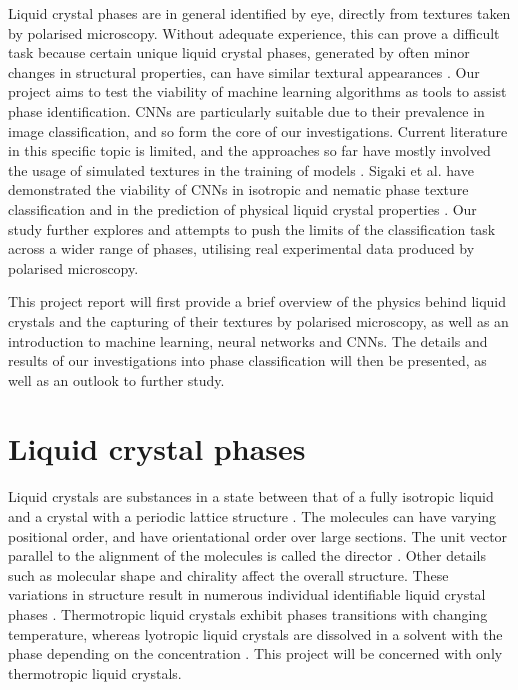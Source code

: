 \documentclass[12pt]{article}
\begin{document}
Liquid crystal phases are in general identified by eye, directly from textures taken by polarised microscopy. Without adequate experience, this can prove a difficult task because certain unique liquid crystal phases, generated by often minor changes in structural properties, can have similar textural appearances \cite{Dierking03}. Our project aims to test the viability of machine learning algorithms as tools to assist phase identification. CNNs are particularly suitable due to their prevalence in image classification, and so form the core of our investigations. Current literature in this specific topic is limited, and the approaches so far have mostly involved the usage of simulated textures in the training of models \cite{Sigaki20, Minor20}. Sigaki et al. have demonstrated the viability of CNNs in isotropic and nematic phase texture classification and in the prediction of physical liquid crystal properties \cite{Sigaki20}. Our study further explores and attempts to push the limits of the classification task across a wider range of phases, utilising real experimental data produced by polarised microscopy.

This project report will first provide a brief overview of the physics behind liquid crystals and the capturing of their textures by polarised microscopy, as well as an introduction to machine learning, neural networks and CNNs. The details and results of our investigations into phase classification will then be presented, as well as an outlook to further study.
\section{Liquid crystal phases}
Liquid crystals are substances in a state between that of a fully isotropic liquid and a crystal with a periodic lattice structure \cite{Demus99, Dierking03}. The molecules can have varying positional order, and have orientational order over large sections. The unit vector parallel to the alignment of the molecules is called the director \cite{Demus99, Dierking03}. Other details such as molecular shape and chirality affect the overall structure. These variations in structure result in numerous individual identifiable liquid crystal phases \cite{Demus99, Dierking03}. Thermotropic liquid crystals exhibit phases transitions with changing temperature, whereas lyotropic liquid crystals are dissolved in a solvent with the phase depending on the concentration \cite{Demus99}. This project will be concerned with only thermotropic liquid crystals. 
\end{document}
